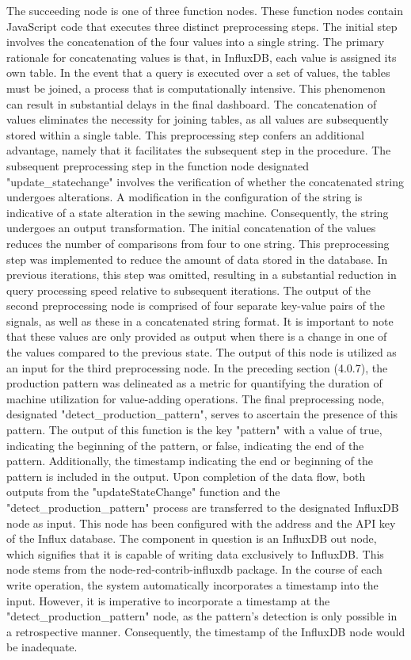 The succeeding node is one of three function nodes. These function nodes contain JavaScript code that executes three distinct preprocessing steps. The initial step involves the concatenation of the four values into a single string. The primary rationale for concatenating values is that, in InfluxDB, each value is assigned its own table. In the event that a query is executed over a set of values, the tables must be joined, a process that is computationally intensive. This phenomenon can result in substantial delays in the final dashboard. The concatenation of values eliminates the necessity for joining tables, as all values are subsequently stored within a single table.
This preprocessing step confers an additional advantage, namely that it facilitates the subsequent step in the procedure. The subsequent preprocessing step in the function node designated "update\_statechange" involves the verification of whether the concatenated string undergoes alterations. A modification in the configuration of the string is indicative of a state alteration in the sewing machine. Consequently, the string undergoes an output transformation. The initial concatenation of the values reduces the number of comparisons from four to one string. This preprocessing step was implemented to reduce the amount of data stored in the database. In previous iterations, this step was omitted, resulting in a substantial reduction in query processing speed relative to subsequent iterations. The output of the second preprocessing node is comprised of four separate key-value pairs of the signals, as well as these in a concatenated string format. It is important to note that these values are only provided as output when there is a change in one of the values compared to the previous state. The output of this node is utilized as an input for the third preprocessing node.
In the preceding section (4.0.7), the production pattern was delineated as a metric for quantifying the duration of machine utilization for value-adding operations. The final preprocessing node, designated "detect\_production\_pattern", serves to ascertain the presence of this pattern. The output of this function is the key "pattern" with a value of true, indicating the beginning of the pattern, or false, indicating the end of the pattern. Additionally, the timestamp indicating the end or beginning of the pattern is included in the output.
Upon completion of the data flow, both outputs from the "updateStateChange" function and the "detect\_production\_pattern" process are transferred to the designated InfluxDB node as input. This node has been configured with the address and the API key of the Influx database. The component in question is an InfluxDB out node, which signifies that it is capable of writing data exclusively to InfluxDB. This node stems from the node-red-contrib-influxdb package. In the course of each write operation, the system automatically incorporates a timestamp into the input. However, it is imperative to incorporate a timestamp at the "detect\_production\_pattern" node, as the pattern's detection is only possible in a retrospective manner. Consequently, the timestamp of the InfluxDB node would be inadequate.




